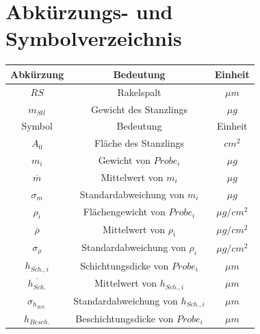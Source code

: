 \documentclass[12pt,UTF8]{article}
\begin{document}

\tableofcontents
\newpage

\part{Abk\"urzungs- und Symbolverzeichnis}
\begin{table}[H]
    \centering
    \begin{tabular}{ccc}
        \midrule
        Abk\"urzung                   & Bedeutung                                   & Einheit      \\
        \toprule
        $RS$                          & Rakelspalt                                  & $\mu m$      \\
        $m_{Stl}$                     & Gewicht des Stanzlings                      & $\mu g$      \\
        \midrule
        \midrule
        Symbol                        & Bedeutung                                   & Einheit      \\
        \toprule
        $A_0$                         & Fl\"ache des Stanzlings                     & $cm^2$       \\
        $m_{i}$                       & Gewicht von $Probe_i$                       & $\mu g$      \\
        $\overline{m}$                & Mittelwert von $m_{i}$                      & $\mu g$      \\
        $\sigma_{m}$                  & Standardabweichung von $m_i$                & $\mu g$      \\
        $\rho_i$                      & Fl\"achengewicht von $Probe_i$              & $\mu g/cm^2$ \\
        $\overline{\rho}$             & Mittelwert von $\rho_i$                     & $\mu g/cm^2$ \\
        $\sigma_{\rho}$               & Standardabweichung von $\rho_i$             & $\mu g/cm^2$ \\
        $h_{Sch.,i}$                  & Schichtungsdicke von $Probe_i$              & $\mu m$      \\
        $\overline{h_{Sch.}}$         & Mittelwert von $h_{Sch.,i}$                 & $\mu m$      \\
        $\sigma_{h_{Sch.}}$           & Standardabweichung von $h_{Sch.,i}$         & $\mu m$      \\
        $h_{Besch.}$                  & Beschichtungsdicke von $Probe_i$            & $\mu m$      \\

\end{tabular}
\end{table}
\end{document}
